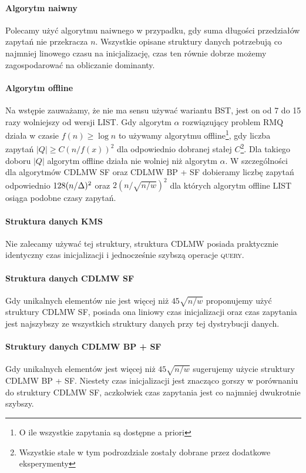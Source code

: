 \paragraph{Algorytm naiwny} Polecamy użyć algorytmu naiwnego w przypadku, gdy suma długości przedziałów zapytań nie przekracza $n$. Wszystkie opisane struktury danych potrzebują co najmniej linowego czasu na inicjalizację, czas ten równie dobrze możemy zagospodarować na obliczanie dominanty.

\paragraph{Algorytm offline} Na wstępie zauważamy, że nie ma sensu używać wariantu \textsc{BST}, jest on od 7 do 15 razy wolniejszy od wersji \textsc{LIST}. Gdy algorytm $\alpha$ rozwiązujący problem \textsc{RMQ} działa w czasie $f(n) \ge \log n$ to używamy algorytmu offline\footnote{O ile wszystkie zapytania są dostępne a priori}, gdy liczba zapytań $|Q| \ge C (n/f(x))^2$ dla odpowiednio dobranej stałej $C$\footnote{Wszystkie stałe w tym podrozdziale zostały dobrane przez dodatkowe eksperymenty}. Dla takiego doboru $|Q|$ algorytm offline działa nie wolniej niż algorytm $\alpha$. W szczególności dla algorytmów \textsc{CDLMW SF} oraz \textsc{CDLMW BP + SF} dobieramy liczbę zapytań odpowiednio $128(n/\Delta)^2$ oraz $2(n/\sqrt{n/w})^2$ dla których algorytm offline \textsc{LIST} osiąga podobne czasy zapytań.

\paragraph{Struktura danych \textsc{KMS}} Nie zalecamy używać tej struktury, struktura \textsc{CDLMW} posiada praktycznie identyczny czas inicjalizacji i jednocześnie szybszą operacje \textsc{query}.

\paragraph{Struktura danych \textsc{CDLMW SF}} Gdy unikalnych elementów nie jest więcej niż $45\sqrt{n/w}$ proponujemy użyć struktury \textsc{CDLMW SF}, posiada ona liniowy czas inicjalizacji oraz czas zapytania jest najszybszy ze wszystkich struktury danych przy tej dystrybucji danych.

\paragraph{Struktury danych \textsc{CDLMW BP + SF}}
Gdy unikalnych elementów jest więcej niż $45\sqrt{n/w}$ sugerujemy użycie struktury \textsc{CDLMW BP + SF}. Niestety czas inicjalizacji jest znacząco gorszy w porównaniu do struktury \textsc{CDLMW SF}, aczkolwiek czas zapytania jest co najmniej dwukrotnie szybszy.
